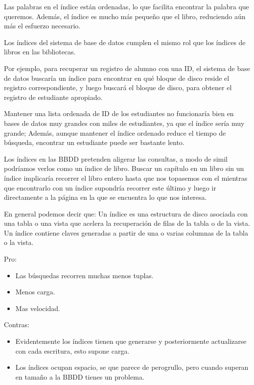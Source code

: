 \documentclass[12pt, fleqn]{report}                             %
\begin{document}
                Las palabras en el índice están ordenadas, lo que facilita encontrar la palabra que queremos.
                Además, el índice es mucho más pequeño que el libro, reduciendo aún más el esfuerzo necesario.

                Los índices del sistema de base de datos cumplen el mismo rol que los índices de libros en
                las bibliotecas.

                Por ejemplo, para recuperar un registro de alumno con una ID, el sistema de base de datos
                buscaría un índice para encontrar en qué bloque de disco reside el registro correspondiente,
                y luego buscará el bloque de disco, para obtener el registro de estudiante apropiado.

                Mantener una lista ordenada de ID de los estudiantes no funcionaría bien en bases de datos
                muy grandes con miles de estudiantes, ya que el índice sería muy grande; Además, aunque mantener
                el índice ordenado reduce el tiempo de búsqueda, encontrar un estudiante puede ser bastante lento.


                \clearpage

                Los índices en las BBDD pretenden aligerar las consultas, a modo de simil podríamos verlos
                como un índice de libro. Buscar un capítulo en un libro sin un índice implicaría recorrer
                el libro entero hasta que nos topasemos con el mientras que encontrarlo con un índice
                supondría recorrer este último y luego ir directamente a la página en la que se encuentra
                lo que nos interesa.

                En general podemos decir que:
                Un índice es una estructura de disco asociada con una tabla o una vista que acelera la 
                recuperación de filas de la tabla o de la vista. Un índice contiene claves generadas a
                partir de una o varias columnas de la tabla o la vista. 

                Pro:
                \begin{itemize}
                    \item Las búsquedas recorren muchas menos tuplas.
                    \item Menos carga.
                    \item Mas velocidad.
                \end{itemize}


                Contras:
                \begin{itemize}
                    \item Evidentemente los índices tienen que generarse y posteriormente actualizarse
                        con cada escritura, esto supone carga.
                    \item Los índices ocupan espacio, se que parece de perogrullo, pero cuando superan en
                        tamaño a la BBDD tienes un problema.
                \end{itemize}
\end{document}
